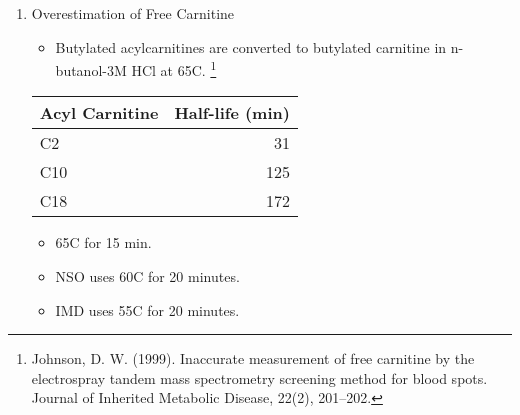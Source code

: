 \documentclass{scrartcl}
\begin{document}
\begin{enumerate}
\item Overestimation of Free Carnitine
\label{sec:orgcfca803}

\begin{itemize}
\item Butylated acylcarnitines are converted to butylated carnitine in
n-butanol-3M HCl at 65\degree{}C. \footnote{Johnson, D. W. (1999). Inaccurate measurement of free
carnitine by the electrospray tandem mass spectrometry screening
method for blood spots. Journal of Inherited Metabolic Disease, 22(2),
201–202.\label{orgc335d92}}
\end{itemize}

\begin{center}
\begin{tabular}{lr}
Acyl Carnitine & Half-life (min)\\
\hline
C2 & 31\\
C10 & 125\\
C18 & 172\\
\end{tabular}
\end{center}

\begin{itemize}
\item 65\degree{}C for 15 min.
\item NSO uses 60\degree{}C for 20 minutes.
\item IMD uses 55\degree{}C for 20 minutes.


\end{itemize}
\end{enumerate}
\end{document}
